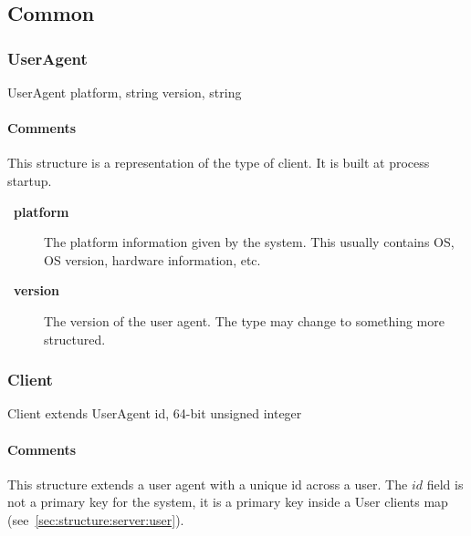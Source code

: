 \documentclass[a4paper,10pt,draft]{article}
\let\Item\item
\newcommand\SpecialItem{\renewcommand\item[1][]{\Item[\textbullet~\bfseries##1]}
}
\begin{document}
\subsection{Common}
\label{sec:structure:common}

\subsubsection{UserAgent}

\begin{verbbox}
UserAgent
{
  platform, string
  version, string
}
\end{verbbox}
\begin{center}
\theverbbox
\end{center}

\begin{inparaitem}[ ]
 \item \infrastructure
\end{inparaitem}

\paragraph*{Comments}
This structure is a representation of the type of client. It is built at process startup.

\SpecialItem
\begin{description}
 \item[platform] The platform information given by the system. This usually contains OS, OS version, hardware information, etc.
 \item[version] The version of the user agent. The type may change to something more structured.
\end{description}

\subsubsection{Client}

\begin{verbbox}
Client extends UserAgent
{
  id, 64-bit unsigned integer
}
\end{verbbox}
\begin{center}
\theverbbox
\end{center}

\begin{inparaitem}[ ]
 \item \infrastructure
\end{inparaitem}

\paragraph*{Comments}
This structure extends a user agent with a unique id across a user. The $id$ field is not a primary key for the system, it is a primary key inside a User clients map 
(see~\ref{sec:structure:server:user}).
\end{document}
